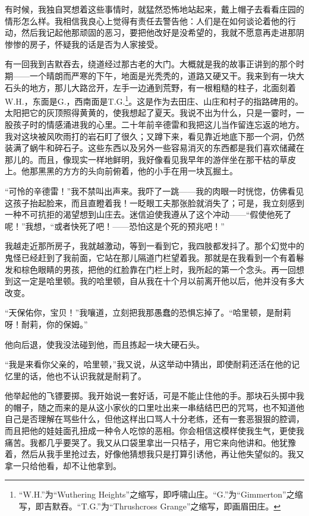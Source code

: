 \par 有时候，我独自冥想着这些事情时，就猛然恐怖地站起来，戴上帽子去看看庄园的情形怎么样。我相信我良心上觉得有责任去警告他：人们是在如何谈论着他的行动，然后我记起他那顽固的恶习，要把他改好是没希望的，我就不愿意再走进那阴惨惨的房子，怀疑我的话是否为人家接受。
\par 有一回我到吉默吞去，绕道经过那古老的大门。大概就是我的故事正讲到的那个时期——一个晴朗而严寒的下午，地面是光秃秃的，道路又硬又干。我来到有一块大石头的地方，那儿大路岔开，左手一边通到荒野，有一根粗糙的柱子，北面刻着W.H.，东面是G.，西南面是T.G.\footnote{“W.H.”为“Wuthering Heights”之缩写，即呼啸山庄。“G.”为“Gimmerton”之缩写，即吉默吞。“T.G.”为“Thrushcross Grange”之缩写，即画眉田庄。}。这是作为去田庄、山庄和村子的指路碑用的。太阳把它的灰顶照得黄黄的，使我想起了夏天。我说不出为什么，只是一霎时，一股孩子时的情感涌进我的心里。二十年前辛德雷和我把这儿当作留连忘返的地方。我对这块被风吹雨打的岩石盯了很久；又蹲下来，看见靠近地底下那一个洞，仍然装满了蜗牛和碎石子。这些东西以及另外一些容易消灭的东西都是我们喜欢储藏在那儿的。而且，像现实一样地鲜明，我好像看见我早年的游伴坐在那干枯的草皮上。他那黑黑的方方的头向前俯着，他的小手在用一块瓦掘土。
\par “可怜的辛德雷！”我不禁叫出声来。我吓了一跳——我的肉眼一时恍惚，仿佛看见这孩子抬起脸来，而且直瞪着我！一眨眼工夫那张脸就消失了；可是，我立刻感到一种不可抗拒的渴望想到山庄去。迷信迫使我遵从了这个冲动——“假使他死了呢！”我想，“或者快死了吧！——恐怕这是个死的预兆吧！”
\par 我越走近那所房子，我就越激动，等到一看到它，我四肢都发抖了。那个幻觉中的鬼怪已经赶到了我前面，它站在那儿隔道门栏望着我。那就是在我看到一个有着鬈发和棕色眼睛的男孩，把他的红脸靠在门栏上时，我所起的第一个念头。再一回想到这一定是哈里顿。我的哈里顿，自从我在十个月以前离开他以后，他并没有多大改变。
\par “天保佑你，宝贝！”我嚷道，立刻把我那愚蠢的恐惧忘掉了。“哈里顿，是耐莉呀！耐莉，你的保姆。”
\par 他向后退，使我没法碰到他，而且拣起一块大硬石头。
\par “我是来看你父亲的，哈里顿，”我又说，从这举动中猜出，即使耐莉还活在他的记忆里的话，他也不认识我就是耐莉了。
\par 他举起他的飞镖要掷。我开始说一套好话，可是不能止住他的手。那块石头掷中我的帽子，随之而来的是从这小家伙的口里吐出来一串结结巴巴的咒骂，也不知道他自己是否理解在骂些什么，但他这样出口骂人十分老练，还有一套恶狠狠的腔调，而且把他的娃娃面孔扭成一种令人吃惊的恶相。你会相信这模样使我生气，更使我痛苦。我都几乎要哭了。我又从口袋里拿出一只桔子，用它来向他讲和。他犹豫着，然后从我手里抢过去，好像他猜想我只是打算引诱他，再让他失望似的。我又拿一只给他看，却不让他拿到。
